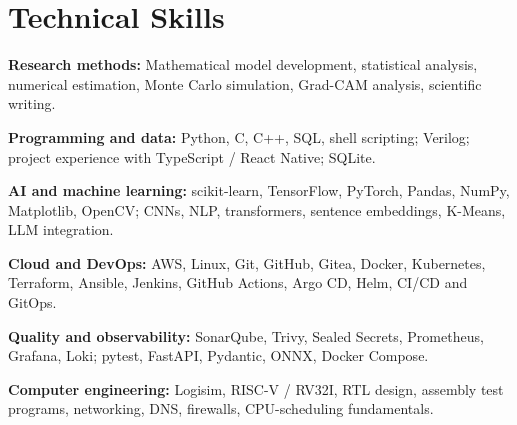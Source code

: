 \documentclass[10pt,a4paper]{article}
\begin{document}
\section*{Technical Skills}
\textbf{Research methods:} Mathematical model development, statistical analysis, numerical estimation, Monte Carlo simulation, Grad-CAM analysis, scientific writing.\par
\textbf{Programming and data:} Python, C, C++, SQL, shell scripting; Verilog; project experience with TypeScript / React Native; SQLite.\par
\textbf{AI and machine learning:} scikit-learn, TensorFlow, PyTorch, Pandas, NumPy, Matplotlib, OpenCV; CNNs, NLP, transformers, sentence embeddings, K-Means, LLM integration.\par
\textbf{Cloud and DevOps:} AWS, Linux, Git, GitHub, Gitea, Docker, Kubernetes, Terraform, Ansible, Jenkins, GitHub Actions, Argo CD, Helm, CI/CD and GitOps.\par
\textbf{Quality and observability:} SonarQube, Trivy, Sealed Secrets, Prometheus, Grafana, Loki; pytest, FastAPI, Pydantic, ONNX, Docker Compose.\par
\textbf{Computer engineering:} Logisim, RISC-V / RV32I, RTL design, assembly test programs, networking, DNS, firewalls, CPU-scheduling fundamentals.\par
\end{document}
